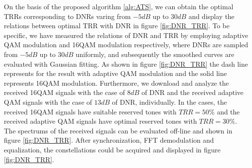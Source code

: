 \documentclass[9pt,twocolumn,twoside]{osajnl}
\begin{document}
On the basis of the proposed algorithm \ref{alg:ATS}, we can obtain the optimal TRRs corresponding to DNRs varing from $-5dB$ up to $30dB$ and display the relations between optimal TRR with DNR in 
figure \ref{fig:DNR_TRR}. To be specific, we have measured the relations of DNR and TRR by employing 
adaptive QAM modulation and 16QAM modulation respectively, where DNRs are sampled from $-5dB$ up to $30dB$ uniformly, and subsequently the smoothed curves are evaluated with Gaussian fitting. As shown 
in figure \ref{fig:DNR_TRR} the dash line represents for the result with adaptive QAM modulation 
and the solid line represents 16QAM modulation. Furthermore, we download and analyze the received 16QAM signals with the case of $8dB$ of DNR and the received adaptive QAM signals with the case of $13dB$ 
of DNR, individually. In the cases, the received 16QAM signals have suitable reserved tones with $TRR=50\%$ and the 
received adaptive QAM signals have optimal reserved tones with $TRR=30\%$. The spectrums of the received signals can be evaluated off-line and shown in figure \ref{fig:DNR_TRR}. After synchronization, FFT 
demodulation and equalization, the constellations could be acquired and displayed in figure \ref{fig:DNR_TRR}.
\end{document}
